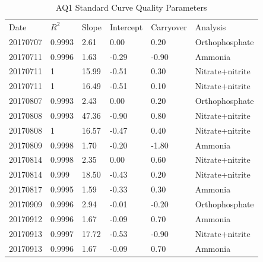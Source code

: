 \begin{table}[]
	\caption{AQ1 Standard Curve Quality Parameters}
	\label{tab:aq1}
\begin{tabular}{llllll}
Date     & $R^2$  & Slope & Intercept & Carryover & Analysis        \\
20170707 & 0.9993 & 2.61  & 0.00      & 0.20      & Orthophosphate  \\
20170711 & 0.9996 & 1.63  & -0.29     & -0.90     & Ammonia         \\
20170711 & 1      & 15.99 & -0.51     & 0.30      & Nitrate+nitrite \\
20170711 & 1      & 16.49 & -0.51     & 0.10      & Nitrate+nitrite \\
20170807 & 0.9993 & 2.43  & 0.00      & 0.20      & Orthophosphate  \\
20170808 & 0.9993 & 47.36 & -0.90     & 0.80      & Nitrate+nitrite \\
20170808 & 1      & 16.57 & -0.47     & 0.40      & Nitrate+nitrite \\
20170809 & 0.9998 & 1.70  & -0.20     & -1.80     & Ammonia         \\
20170814 & 0.9998 & 2.35  & 0.00      & 0.60      & Nitrate+nitrite \\
20170814 & 0.999  & 18.50 & -0.43     & 0.20      & Nitrate+nitrite \\
20170817 & 0.9995 & 1.59  & -0.33     & 0.30      & Ammonia         \\
20170909 & 0.9996 & 2.94  & -0.01     & -0.20     & Orthophosphate  \\
20170912 & 0.9996 & 1.67  & -0.09     & 0.70      & Ammonia         \\
20170913 & 0.9997 & 17.72 & -0.53     & -0.90     & Nitrate+nitrite \\
20170913 & 0.9996 & 1.67  & -0.09     & 0.70      & Ammonia        
\end{tabular}
\end{table}


